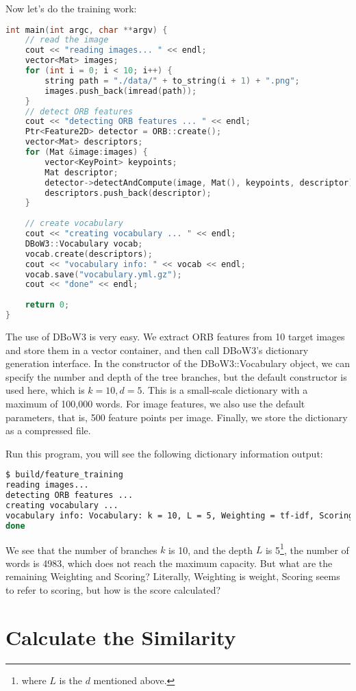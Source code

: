 Now let's do the training work: 
\begin{lstlisting}[language=c++,caption=slambook2/ch11/feature\_training.cpp]
int main(int argc, char **argv) {
	// read the image 
	cout << "reading images... " << endl;
	vector<Mat> images;
	for (int i = 0; i < 10; i++) {
		string path = "./data/" + to_string(i + 1) + ".png";
		images.push_back(imread(path));
	}
	// detect ORB features
	cout << "detecting ORB features ... " << endl;
	Ptr<Feature2D> detector = ORB::create();
	vector<Mat> descriptors;
	for (Mat &image:images) {
		vector<KeyPoint> keypoints;
		Mat descriptor;
		detector->detectAndCompute(image, Mat(), keypoints, descriptor);
		descriptors.push_back(descriptor);
	}
	
	// create vocabulary 
	cout << "creating vocabulary ... " << endl;
	DBoW3::Vocabulary vocab;
	vocab.create(descriptors);
	cout << "vocabulary info: " << vocab << endl;
	vocab.save("vocabulary.yml.gz");
	cout << "done" << endl;
	
	return 0;
}
\end{lstlisting}
The use of DBoW3 is very easy. We extract ORB features from 10 target images and store them in a vector container, and then call DBoW3's dictionary generation interface. In the constructor of the DBoW3::Vocabulary object, we can specify the number and depth of the tree branches, but the default constructor is used here, which is $k=10,d=5$. This is a small-scale dictionary with a maximum of 100,000 words. For image features, we also use the default parameters, that is, 500 feature points per image. Finally, we store the dictionary as a compressed file.

Run this program, you will see the following dictionary information output:
\begin{lstlisting}[language=sh,caption=Terminal output:]
$ build/feature_training
reading images...
detecting ORB features ...
creating vocabulary ...
vocabulary info: Vocabulary: k = 10, L = 5, Weighting = tf-idf, Scoring = L1-norm, Number of words = 4983
done
\end{lstlisting}
We see that the number of branches $k$ is 10, and the depth $L$ is 5\footnote{where $L$ is the $d$ mentioned above. }, the number of words is 4983, which does not reach the maximum capacity. But what are the remaining Weighting and Scoring? Literally, Weighting is weight, Scoring seems to refer to scoring, but how is the score calculated?


\section{Calculate the Similarity}
